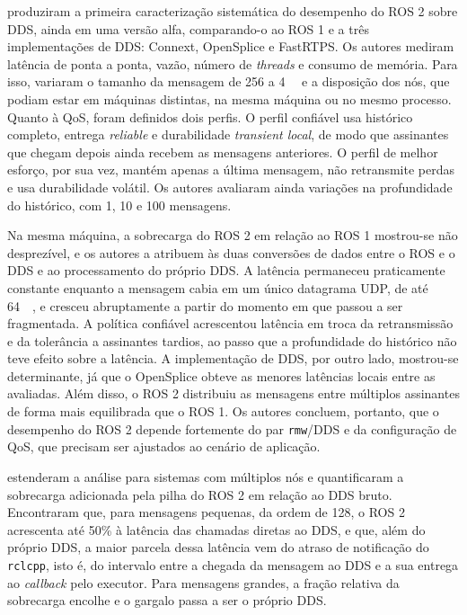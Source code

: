 \documentclass[
    12pt,
    oneside,
    a4paper,
    chapter=TITLE,
    section=TITLE,
    english,
    brazil
]{abntex2}
\begin{document}
 produziram a primeira caracterização
sistemática do desempenho do ROS 2 sobre DDS, ainda em uma versão alfa,
comparando-o ao ROS 1 e a três implementações de DDS: Connext, OpenSplice
e FastRTPS. Os autores mediram latência de ponta a ponta, vazão, número
de \textit{threads} e consumo de memória. Para isso, variaram o tamanho da
mensagem de \SI{256}{\byte} a \SI{4}{\mega\byte} e a disposição dos nós,
que podiam estar em máquinas distintas, na mesma máquina ou no mesmo
processo. Quanto à QoS, foram definidos dois perfis. O perfil confiável
usa histórico completo, entrega \textit{reliable} e durabilidade
\textit{transient local}, de modo que assinantes que chegam depois ainda
recebem as mensagens anteriores. O perfil de melhor esforço, por sua vez,
mantém apenas a última mensagem, não retransmite perdas e usa
durabilidade volátil. Os autores avaliaram ainda variações na
profundidade do histórico, com 1, 10 e 100 mensagens.

Na mesma máquina, a sobrecarga do ROS 2 em relação ao ROS 1 mostrou-se
não desprezível, e os autores a atribuem às duas conversões de dados
entre o ROS e o DDS e ao processamento do próprio DDS. A latência
permaneceu praticamente constante enquanto a mensagem cabia em um único
datagrama UDP, de até \SI{64}{\kilo\byte}, e cresceu abruptamente a
partir do momento em que passou a ser fragmentada. A política confiável
acrescentou latência em troca da retransmissão e da tolerância a
assinantes tardios, ao passo que a profundidade do histórico não teve
efeito sobre a latência. A implementação de DDS, por outro lado,
mostrou-se determinante, já que o OpenSplice obteve as menores latências
locais entre as avaliadas. Além disso, o ROS 2 distribuiu as mensagens
entre múltiplos assinantes de forma mais equilibrada que o ROS 1. Os
autores concluem, portanto, que o desempenho do ROS 2 depende fortemente
do par \texttt{rmw}/DDS e da configuração de QoS, que precisam ser
ajustados ao cenário de aplicação.

 estenderam a análise para sistemas com
múltiplos nós e quantificaram a sobrecarga adicionada pela pilha do ROS 2
em relação ao DDS bruto. Encontraram que, para mensagens pequenas, da
ordem de \SI{128}{\byte}, o ROS 2 acrescenta até 50\% à latência das
chamadas diretas ao DDS, e que, além do próprio DDS, a maior parcela
dessa latência vem do atraso de notificação do \texttt{rclcpp}, isto é,
do intervalo entre a chegada da mensagem ao DDS e a sua entrega ao
\textit{callback} pelo executor. Para mensagens grandes, a fração
relativa da sobrecarga encolhe e o gargalo passa a ser o próprio DDS.
\end{document}
